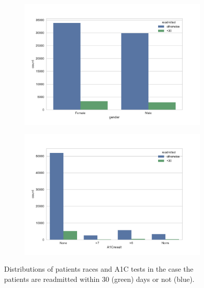 \documentclass[12pt]{article}
\begin{document}
\begin{figure}[t!]
	\hspace{-0.7cm}
    \begin{subfigure}[b]{0.5\textwidth}
    	\hspace{-.5cm}
        \includegraphics[width=9.2cm]{gender.pdf}
        \label{fig:chi_FD}
    \end{subfigure}
    \hspace{0.8cm} %
    \begin{subfigure}[b]{0.5\textwidth}
    	\hspace{-0.5cm}
        \includegraphics[width=9.2cm]{A1Cresult.pdf}
        \label{fig:chi_Dz}
    \end{subfigure}    

   \caption{\small Distributions of patients races and A1C tests in the case the patients are readmitted within 30 (green) days or not (blue).}
    \label{gender_test}
\end{figure}
\end{document}
